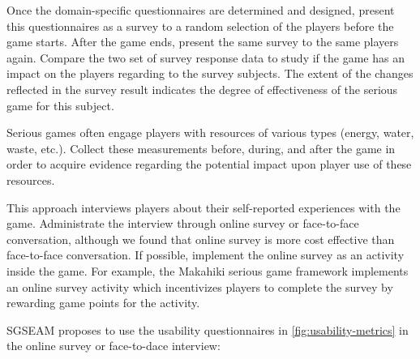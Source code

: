 Once the domain-specific questionnaires are determined and designed, present this questionnaires as a 
survey to a random selection of the players before the game starts. After the game ends, present the same 
survey to the same players again. Compare the two set of survey response data to study if the game has an 
impact on the players regarding to the survey subjects. The extent of the changes reflected in the survey 
result indicates the degree of effectiveness of the serious game for this subject.

Serious games often engage players with resources of various types (energy, water, waste, etc.). Collect 
these measurements before, during, and after the game in order to acquire evidence regarding the potential 
impact upon player use of these resources.

\label{Self-reported usability metrics}

This approach interviews players about their self-reported experiences with the game. Administrate the 
interview through online survey or face-to-face conversation, although we found that online survey is more 
cost effective than face-to-face conversation. If possible, implement the online survey as an activity inside the 
game. For example, the Makahiki serious game framework implements an online survey activity which 
incentivizes players to complete the survey by rewarding game points for the activity.

SGSEAM proposes to use the usability questionnaires in \autoref{fig:usability-metrics} in the online survey or face-to-dace interview:\\


